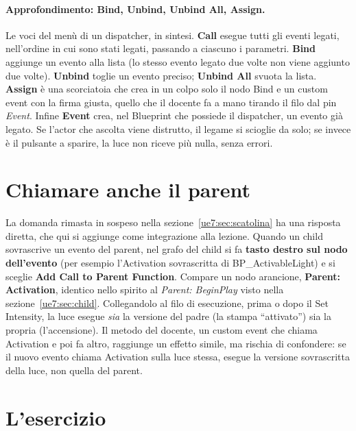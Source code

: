 \paragraph{Approfondimento: Bind, Unbind, Unbind All, Assign.} Le voci del menù di un
dispatcher, in sintesi. \textbf{Call} esegue tutti gli eventi legati, nell'ordine in cui
sono stati legati, passando a ciascuno i parametri. \textbf{Bind} aggiunge un evento alla
lista (lo stesso evento legato due volte non viene aggiunto due volte).
\textbf{Unbind} toglie un evento preciso; \textbf{Unbind All} svuota la lista.
\textbf{Assign} è una scorciatoia che crea in un colpo solo il nodo Bind e un custom
event con la firma giusta, quello che il docente fa a mano tirando il filo dal pin
\emph{Event}. Infine \textbf{Event} crea, nel Blueprint che possiede il dispatcher, un
evento già legato. Se l'actor che ascolta viene distrutto, il legame si scioglie da
solo; se invece è il pulsante a sparire, la luce non riceve più nulla, senza errori.

\section{Chiamare anche il parent}
\label{ue7:sec:parent}

La domanda rimasta in sospeso nella sezione~\ref{ue7:sec:scatolina} ha una risposta
diretta, che qui si aggiunge come integrazione alla lezione. Quando un child sovrascrive
un evento del parent, nel grafo del child si fa \textbf{tasto destro sul nodo
dell'evento} (per esempio l'Activation sovrascritta di BP\_ActivableLight) e si sceglie
\textbf{Add Call to Parent Function}. Compare un nodo arancione, \textbf{Parent:
Activation}, identico nello spirito al \emph{Parent: BeginPlay} visto nella
sezione~\ref{ue7:sec:child}. Collegandolo al filo di esecuzione, prima o dopo il Set
Intensity, la luce esegue \emph{sia} la versione del padre (la stampa ``attivato'') sia
la propria (l'accensione). Il metodo del docente, un custom event che chiama Activation e
poi fa altro, raggiunge un effetto simile, ma rischia di confondere: se il nuovo evento
chiama Activation sulla luce stessa, esegue la versione sovrascritta della luce, non
quella del parent.

\section{L'esercizio}
\label{ue7:sec:esercizio}

